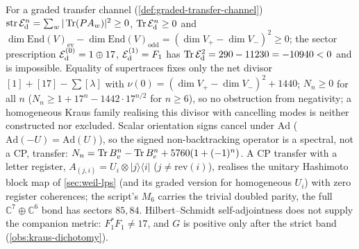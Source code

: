 \begin{observation}
\label{obs:lps-graded-cp-open}
For a graded transfer channel (\cref{def:graded-transfer-channel}) $\operatorname{str}\mathcal E_{\mathrm d}^n = \sum_w|\operatorname{Tr}(PA_w)|^2\ge0$, $\operatorname{Tr}\mathcal E_{\mathrm d}^n\ge0$ and
$\dim\mathrm{End}(V)_{\mathrm{ev}}-\dim\mathrm{End}(V)_{\mathrm{odd}} = (\dim V_+-\dim V_-)^2\ge0$; the sector prescription ${\mathcal E_{\mathrm d}^{(0)}} = 1\oplus17$,
${\mathcal E_{\mathrm d}^{(1)}} = F_1$ has $\operatorname{Tr}\mathcal E_{\mathrm d}^2 = 290-11230 = -10940<0$ and is impossible. Equality of supertraces fixes only the net divisor
$[1]+[17]-\sum[\lambda]$ with $\nu(0) = (\dim V_+-\dim V_-)^2+1440$; $N_n\ge0$ for all $n$ ($N_n\ge1+17^n-1442\cdot17^{n/2}$ for
$n\ge6$), so no obstruction from negativity; a homogeneous Kraus family realising this divisor with cancelling modes is
neither constructed nor excluded. Scalar orientation signs cancel under $\mathrm{Ad}$ ($\mathrm{Ad}(-U) = \mathrm{Ad}(U)$), so the
signed non-backtracking operator is a spectral, not a CP, transfer: $N_n = \operatorname{Tr} B_v^n-\operatorname{Tr} B_e^n+5760(1+(-1)^n)$. A CP
transfer with a letter register, $A_{(j,i)} = U_i\otimes|j\rangle\langle i|$ ($j\ne\mathrm{rev}(i)$), realises the unitary Hashimoto
block map of \cref{sec:weil-lps} (and its graded version for homogeneous $U_i$) with zero register coherences; the
script's $M_6$ carries the trivial doubled parity, the full $\mathbb C^7\oplus\mathbb C^6$ bond has sectors $85,84$. Hilbert--Schmidt
self-adjointness does not supply the companion metric: $F_1^{*}F_1\ne17$, and $G$ is positive only after the strict band
(\cref{obs:kraus-dichotomy}).
\end{observation}


